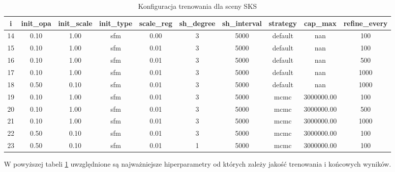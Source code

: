 \begin{table}[h]
    \centering
    \begin{tabular}{|c|c|c|c|c|c|c|c|c|c|}
    \hline
    i & init\_opa & init\_scale & init\_type & scale\_reg & sh\_degree & sh\_interval & strategy & cap\_max & refine\_every \\
    \hline
    14 & 0.10 & 1.00 & sfm & 0.00 & 3 & 5000 & default & nan & 100 \\
    \hline
    15 & 0.10 & 1.00 & sfm & 0.01 & 3 & 5000 & default & nan & 100 \\
    \hline
    16 & 0.10 & 1.00 & sfm & 0.01 & 3 & 5000 & default & nan & 500 \\
    \hline
    17 & 0.10 & 1.00 & sfm & 0.01 & 3 & 5000 & default & nan & 1000 \\
    \hline
    18 & 0.50 & 0.10 & sfm & 0.01 & 3 & 5000 & default & nan & 1000 \\
    \hline
    19 & 0.10 & 1.00 & sfm & 0.01 & 3 & 5000 & mcmc & 3000000.00 & 100 \\
    \hline
    20 & 0.10 & 1.00 & sfm & 0.01 & 3 & 5000 & mcmc & 3000000.00 & 500 \\
    \hline
    21 & 0.10 & 1.00 & sfm & 0.01 & 3 & 5000 & mcmc & 3000000.00 & 1000 \\
    \hline
    22 & 0.50 & 0.10 & sfm & 0.01 & 3 & 5000 & mcmc & 3000000.00 & 100 \\
    \hline
    23 & 0.50 & 0.10 & sfm & 0.01 & 1 & 5000 & mcmc & 3000000.00 & 100 \\
    \hline
    \end{tabular}
    \caption{Konfiguracja trenowania dla sceny SKS}
    \label{table:tab_conf_sks}
\end{table}

W powyższej tabeli \ref{table:tab_conf_sks} uwzględnione są najważniejsze hiperparametry od których zależy jakość trenowania i końcowych wyników. 

